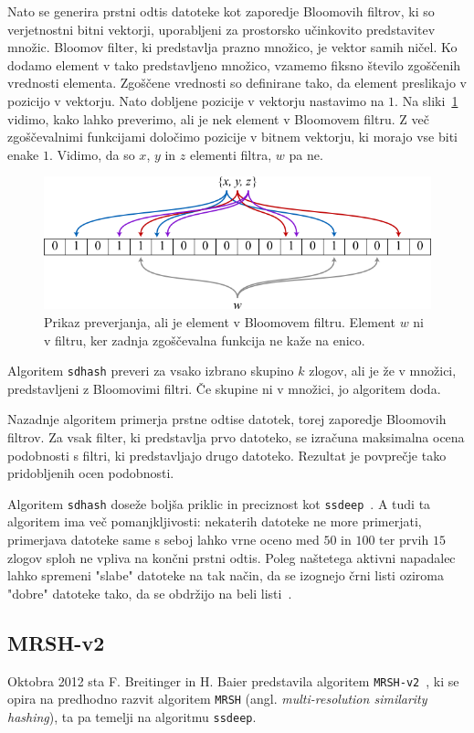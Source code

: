 \documentclass{acm_proc_article-sp}
\begin{document}
Nato se generira prstni odtis datoteke kot zaporedje Bloo\-mo\-vih filtrov, ki so verjetnostni bitni vektorji, uporabljeni za prostorsko učinkovito predstavitev množic. Bloomov filter, ki predstavlja prazno množico, je vektor samih ničel. Ko dodamo element v tako predstavljeno množico, vzamemo fiksno število zgoščenih vrednosti elementa. Zgoščene vrednosti so definirane tako, da element preslikajo v pozicijo v vektorju. Nato dobljene pozicije v vektorju nastavimo na $1$. Na sliki~\ref{bloom} vidimo, kako lahko preverimo, ali je nek element v Bloomovem filtru. Z več zgoščevalnimi funkcijami določimo pozicije v bitnem vektorju, ki morajo vse biti enake $1$. Vidimo, da so $x$, $y$ in $z$ elementi filtra, $w$ pa ne.
\begin{figure}
\centering
\includegraphics[width=\linewidth]{bloom.png}
\caption{Prikaz preverjanja, ali je element v Bloomovem filtru. Element $w$ ni v filtru, ker zadnja zgoščevalna funkcija ne kaže na enico.}
\label{bloom}
\end{figure}
Algoritem \texttt{sdhash} preveri za vsako izbrano skupino $k$ zlogov, ali je že v množici, predstavljeni z Bloomovimi filtri. Če skupine ni v množici, jo algoritem doda.

Nazadnje algoritem primerja prstne odtise datotek, torej zaporedje Bloomovih filtrov. Za vsak filter, ki predstavlja prvo datoteko, se izračuna maksimalna ocena podobnosti s filtri, ki predstavljajo drugo datoteko. Rezultat je povprečje tako pridobljenih ocen podobnosti.

Algoritem \texttt{sdhash} doseže boljša priklic in preciznost kot \texttt{ssdeep}~\cite{fbhash}. A tudi ta algoritem ima več pomanjkljivosti: nekaterih datoteke ne more primerjati, primerjava datoteke same s seboj lahko vrne oceno med $50$ in $100$ ter prvih $15$ zlogov sploh ne vpliva na končni prstni odtis. Poleg naštetega aktivni napadalec lahko spremeni "slabe" datoteke na tak način, da se izognejo črni listi oziroma "dobre" datoteke tako, da se obdržijo na beli listi~\cite{breitinger2012security}.

\subsection{MRSH-v2}
Oktobra 2012 sta F. Breitinger in H. Baier predstavila algoritem \texttt{MRSH-v2}~\cite{mrsh-v2}, ki se opira na predhodno razvit algoritem \texttt{MRSH} (angl. \emph{multi-resolution similarity hashing}), ta pa temelji na algoritmu \texttt{ssdeep}. 
\end{document}
